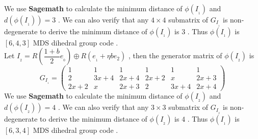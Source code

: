 \documentclass{article}
\begin{document}
We use \textbf{Sagemath} to calculate the minimum distance of $\phi(I_{_1})$ and $d(\phi(I_{_1}))=3$ . We can also verify that any $4\times4$ submatrix of $G_{I_{_1}}$ is non-degenerate to derive the minimum distance of $\phi(I_{_1})$ is $3$ . Thus $\phi(I_{_1})$ is $[6,4,3]$ MDS dihedral group code .\\
Let $I_{_2}=R(\dfrac{1+b}{2}e_{_0})\oplus R(e_{_1}+\eta be{_2})$ , then the generator matrix of $\phi(I_{_2})$ is 
\begin{equation*}
    G_{I_{_1}}=\begin{pmatrix}
        1&1&1&1&1&1\\
        2&3x+4&2x+4&2x+2&x&2x+3\\
        2x+2&x&2x+3&2&3x+4&2x+4
    \end{pmatrix}
\end{equation*}
We use \textbf{Sagemath} to calculate the minimum distance of $\phi(I_{_2})$ and $d(\phi(I_{_2}))=4$ . We can also verify that any $3\times3$ submatrix of $G_{I_{_2}}$ is non-degenerate to derive the minimum distance of $\phi(I_{_2})$ is $4$ . Thus $\phi(I_{_1})$ is $[6,3,4]$ MDS dihedral group code .\\

\newpage




\end{document}
